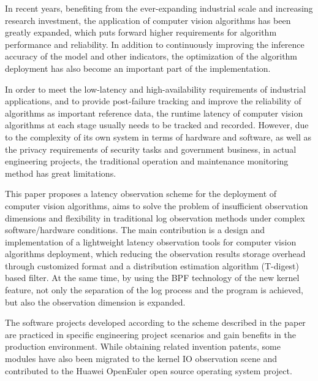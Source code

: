 \documentclass[master]{shtthesis}
\begin{document}
\begin{abstract*}[flattitle]
In recent years, benefiting from the ever-expanding industrial scale and increasing research investment, the application of computer vision algorithms has been greatly expanded, which puts forward higher requirements for algorithm performance and reliability. In addition to continuously improving the  inference accuracy of the model and other indicators, the optimization of the algorithm deployment has also become an important part of the implementation.

In order to meet the low-latency and high-availability requirements of industrial applications, and to provide post-failure tracking and improve the reliability of algorithms as important reference data, the runtime latency of computer vision algorithms at each stage usually needs to be tracked and recorded. However, due to the complexity of its own system in terms of hardware and software, as well as the privacy requirements of security tasks and government business, in actual engineering projects, the traditional operation and maintenance monitoring method has great limitations.

This paper proposes a latency observation scheme for the deployment of computer vision algorithms, aims to solve the problem of insufficient observation dimensions and flexibility in traditional log observation methods under complex software/hardware conditions. The main contribution is a design and implementation of a lightweight latency observation tools for computer vision algorithms deployment, which reducing the observation results storage overhead through customized format and a distribution estimation algorithm (T-digest) based filter. At the same time, by using the BPF technology of the new kernel feature, not only the separation of the log process and the program is achieved, but also the observation dimension is expanded.

The software projects developed according to the scheme described in the paper are practiced in specific engineering project scenarios and gain benefits in the production environment. While obtaining related invention patents, some modules have also been migrated to the kernel IO observation scene and contributed to the Huawei OpenEuler open source operating system project.

\end{abstract*}

\makeindices
\end{document}
